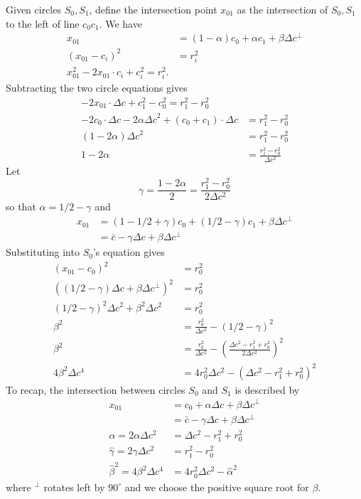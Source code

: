 \documentclass[11pt]{article}
\begin{document}
{Given circles $S_0, S_1$, define the intersection point $x_{01}$ as the intersection
of $S_0,S_1$ to the left of line $c_0c_1$.  We have
\begin{align*}
x_{01} &= (1-\alpha) c_0 + \alpha c_1 + \beta \Delta c^\perp \\
(x_{01} - c_i)^2 &= r_i^2 \\
x_{01}^2 - 2x_{01} \cdot c_i + c_i^2 = r_i^2.
\end{align*}
Subtracting the two circle equations gives
\begin{align*}
-2x_{01} \cdot \Delta c + c_1^2 - c_0^2 = r_1^2 - r_0^2 \\
-2c_0 \cdot \Delta c -2\alpha {\Delta c}^2 + (c_0 + c_1) \cdot \Delta c &= r_1^2 - r_0^2 \\
(1-2\alpha) {\Delta c}^2 &= r_1^2 - r_0^2 \\
1 - 2 \alpha &= \frac{r_1^2 - r_0^2}{\Delta c^2}
\end{align*}
Let
$$\gamma = \frac{1 - 2\alpha}{2} = \frac{r_1^2 - r_0^2}{2\Delta c^2}$$
so that $\alpha = 1/2 - \gamma$ and
\begin{align*}
x_{01} &= (1-1/2 + \gamma) c_0 + (1/2 - \gamma) c_1 + \beta \Delta c^\perp \\
       &= \bar{c} - \gamma \Delta c + \beta \Delta c^\perp
\end{align*}
Substituting into $S_0$'s equation gives
\begin{align*}
(x_{01} - c_0)^2 &= r_0^2 \\
\left((1/2 - \gamma) \Delta c + \beta \Delta c^\perp \right)^2 &= r_0^2 \\
(1/2 - \gamma)^2 \Delta c^2 + \beta^2 \Delta c^2 &= r_0^2 \\
\beta^2 &= \frac{r_0^2}{\Delta c^2} - (1/2 - \gamma)^2 \\
\beta^2 &= \frac{r_0^2}{\Delta c^2} - \left(\frac{\Delta c^2 - r_1^2 + r_0^2}{2 \Delta c^2}\right)^2 \\
4 \beta^2 \Delta c^4 &= 4 r_0^2 \Delta c^2 - \left( \Delta c^2 - r_1^2 + r_0^2 \right)^2
\end{align*}
To recap, the intersection between circles $S_0$ and $S_1$ is described by
\begin{align*}
x_{01} &= c_0 + \alpha \Delta c + \beta \Delta c^\perp \\
       &= \bar{c} - \gamma \Delta c + \beta \Delta c^\perp \\
\hat{\alpha} = 2 \alpha \Delta c^2 &= \Delta c^2 - r_1^2 + r_0^2 \\
\hat{\gamma} = 2 \gamma \Delta c^2 &= r_1^2 - r_0^2 \\
\hat{\beta}^2 = 4 \beta^2 \Delta c^4 &= 4 r_0^2 \Delta c^2 - \hat{\alpha}^2
\end{align*}
where $^\perp$ rotates left by $90^\circ$ and we choose the positive square root for $\beta$.

}
\end{document}
